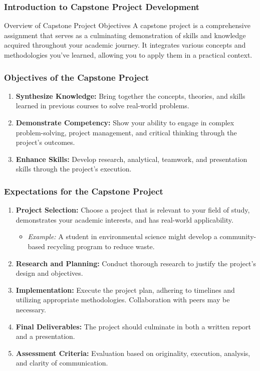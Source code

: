 \documentclass[aspectratio=169]{beamer}
\begin{document}
\frame{\titlepage}

\begin{frame}[fragile]
    \frametitle{Introduction to Capstone Project Development}
    \begin{block}{Overview of Capstone Project Objectives}
        A capstone project is a comprehensive assignment that serves as a culminating demonstration of skills and knowledge acquired throughout your academic journey. It integrates various concepts and methodologies you've learned, allowing you to apply them in a practical context.
    \end{block}
\end{frame}

\begin{frame}[fragile]
    \frametitle{Objectives of the Capstone Project}
    \begin{enumerate}
        \item \textbf{Synthesize Knowledge:} Bring together the concepts, theories, and skills learned in previous courses to solve real-world problems.
        \item \textbf{Demonstrate Competency:} Show your ability to engage in complex problem-solving, project management, and critical thinking through the project’s outcomes.
        \item \textbf{Enhance Skills:} Develop research, analytical, teamwork, and presentation skills through the project’s execution.
    \end{enumerate}
\end{frame}

\begin{frame}[fragile]
    \frametitle{Expectations for the Capstone Project}
    \begin{enumerate}
        \item \textbf{Project Selection:} Choose a project that is relevant to your field of study, demonstrates your academic interests, and has real-world applicability.
        \begin{itemize}
            \item \textit{Example:} A student in environmental science might develop a community-based recycling program to reduce waste.
        \end{itemize}       
        \item \textbf{Research and Planning:} Conduct thorough research to justify the project’s design and objectives.
        \item \textbf{Implementation:} Execute the project plan, adhering to timelines and utilizing appropriate methodologies. Collaboration with peers may be necessary.
        \item \textbf{Final Deliverables:} The project should culminate in both a written report and a presentation.
        \item \textbf{Assessment Criteria:} Evaluation based on originality, execution, analysis, and clarity of communication.
    \end{enumerate}
\end{frame}
\end{document}

